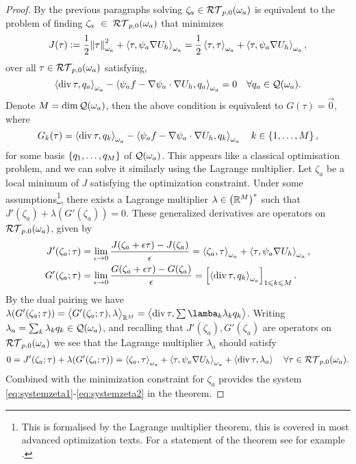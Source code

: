 \documentclass[thesis.tex]{subfiles}
\begin{document}
\begin{proof}
  By the previous paragraphs solving $\zeta_a \in \mathcal{RT}_{p,0}(\omega_a)$ is equivalent to the problem of finding $\zeta_a~\in~\mathcal{RT}_{p,0}(\omega_a)$ that minimizes
  \[
    J(\tau) := \frac{1}{2} \norm{\tau}^2_{\omega_a} + \left \langle \tau, \psi_a \nabla U_h \right \rangle_{\omega_a} = \frac{1}{2} \left \langle \tau, \tau \right \rangle_{\omega_a} + \left \langle \tau, \psi_a \nabla U_h \right \rangle_{\omega_a},
  \]
  over all $\tau \in \mathcal{RT}_{p,0}(\omega_a)$ satisfying,
  \[
    \left \langle \operatorname{div} \tau, q_a \right \rangle_{\omega_a} - \left \langle \psi_a f - \nabla \psi_a \cdot \nabla U_h, q_a \right \rangle_{\omega_a}=0  \quad \forall q_a \in \mathcal{Q}(\omega_a).
  \]
  Denote $M = \dim \mathcal{Q}(\omega_a)$, then the above condition is equivalent to $G(\tau) = \vec{0}$, where
  \[
    G_k(\tau) = \left \langle \operatorname{div} \tau, q_k \right \rangle_{\omega_a} - \left \langle \psi_a f - \nabla \psi_a \cdot \nabla U_h, q_k \right \rangle_{\omega_a}  \quad k \in \set{1, \dots, M},
  \]
  for some basis $\set{q_1,\dots, q_M}$ of $\mathcal{Q}(\omega_a)$. This appears like a classical optimisation problem, and we can
  solve it similarly using the Lagrange multiplier.  Let $\zeta_a$ be a local minimum of $J$ satisfying the optimization constraint. 
  Under some assumptions\footnote{This is formalised by the Lagrange multiplier theorem, this is covered in most  advanced optimization texts.
  For a statement of the theorem see for example \cite{botelho2013lagrange}.}, there exists a Lagrange multiplier $\lambda \in \left(\mathbb{R}^{M}\right)^*$ such that $J'(\zeta_a) + \lambda(G'(\zeta_a))=0$.
  These generalized derivatives are operators on $\mathcal{RT}_{p,0}(\omega_a)$, given by
  \begin{align*}
    J'(\zeta_a; \tau) &= \lim_{\epsilon \to 0} \frac{J(\zeta_a + \epsilon \tau) - J(\zeta_a)}{\epsilon} = \left \langle \zeta_a, \tau \right \rangle_{\omega_a} +\left \langle \tau, \psi_a \nabla U_h \right \rangle_{\omega_a},\\
    G'(\zeta_a; \tau) &= \lim_{\epsilon \to 0} \frac{G(\zeta_a + \epsilon \tau) - G(\zeta_a)}{\epsilon}  = \left[ \left \langle \operatorname{div} \tau, q_k \right \rangle_{\omega_a}\right]_{1 \leqslant k \leqslant M}.
  \end{align*}
  By the dual pairing we have
  $\lambda(G'(\zeta_a; \tau)) = \ip{G'(\zeta_a;\tau), \lambda}_{\R^M} = \ip{\div \tau, \sum \lamba_k \lambda_k q_k}$.
  Writing $\lambda_a = \sum_k \lambda_k q_k \in \mathcal{Q}(\omega_a)$, and recalling that $J'(\zeta_a), G'(\zeta_a)$ are operators on $\mathcal{RT}_{p,0}(\omega_a)$ 
  we see that the Lagrange multiplier $\lambda_a$ should satisfy
  \[
    0 = J'(\zeta_a; \tau) + \lambda(G'(\zeta_a; \tau)) = \left \langle \zeta_a, \tau \right \rangle_{\omega_a} + \left \langle \tau, \psi_a\nabla U_h \right \rangle_{\omega_a} + \left \langle \operatorname{div} \tau, \lambda_a \right \rangle\quad \forall \tau \in \mathcal{RT}_{p,0}(\omega_a).
  \]
  Combined with the minimization constraint for $\zeta_a$ provides the system \eqref{eq:systemzeta1}-\eqref{eq:systemzeta2} in the theorem.


\end{proof}
\end{document}
